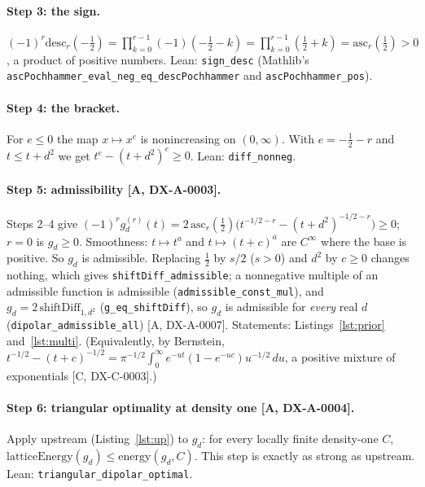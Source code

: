 \documentclass[11pt]{article}
\theoremstyle{remark}
\newcommand{\tier}[1]{\textsf{[#1]}}
\newcommand{\lean}[1]{\texttt{#1}}
\begin{document}
\paragraph{Step 3: the sign.} $(-1)^r\mathrm{desc}_r(-\tfrac12)=\prod_{k=0}^{r-1}(-1)(-\tfrac12-k)
=\prod_{k=0}^{r-1}(\tfrac12+k)=\mathrm{asc}_r(\tfrac12)>0$, a product of positive numbers. Lean: \lean{sign\_desc}
(Mathlib's \lean{ascPochhammer\_eval\_neg\_eq\_descPochhammer} and \lean{ascPochhammer\_pos}).

\paragraph{Step 4: the bracket.} For $e\le0$ the map $x\mapsto x^e$ is nonincreasing on $(0,\infty)$. With
$e=-\tfrac12-r$ and $t\le t+d^2$ we get $t^{e}-(t+d^2)^{e}\ge0$. Lean: \lean{diff\_nonneg}.

\paragraph{Step 5: admissibility \tier{A, DX-A-0003}.} Steps 2--4 give
$(-1)^r g_d^{(r)}(t)=2\,\mathrm{asc}_r(\tfrac12)\bigl(t^{-1/2-r}-(t+d^2)^{-1/2-r}\bigr)\ge0$; $r=0$ is $g_d\ge0$.
Smoothness: $t\mapsto t^a$ and $t\mapsto(t+c)^a$ are $C^\infty$ where the base is positive. So $g_d$ is admissible.
Replacing $\tfrac12$ by $s/2$ ($s>0$) and $d^2$ by $c\ge0$ changes nothing, which gives \lean{shiftDiff\_admissible}; a
nonnegative multiple of an admissible function is admissible (\lean{admissible\_const\_mul}), and
$g_d=2\,\mathrm{shiftDiff}_{1,d^2}$ (\lean{g\_eq\_shiftDiff}), so $g_d$ is admissible for \emph{every} real $d$
(\lean{dipolar\_admissible\_all}) \tier{A, DX-A-0007}. Statements: Listings~\ref{lst:prior} and~\ref{lst:multi}. (Equivalently, by Bernstein,
$t^{-1/2}-(t+c)^{-1/2}=\pi^{-1/2}\int_0^\infty e^{-ut}(1-e^{-uc})u^{-1/2}\,du$, a positive mixture of exponentials
\tier{C, DX-C-0003}.)

\paragraph{Step 6: triangular optimality at density one \tier{A, DX-A-0004}.} Apply upstream (Listing~\ref{lst:up}) to
$g_d$: for every locally finite density-one $C$, $\mathrm{latticeEnergy}(g_d)\le\mathrm{energy}(g_d,C)$. This step is
exactly as strong as upstream. Lean: \lean{triangular\_dipolar\_optimal}.
\end{document}
